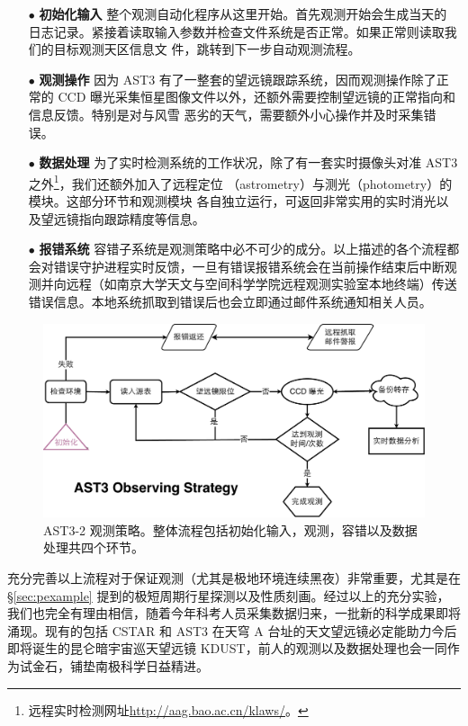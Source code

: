 \begin{enumerate}[leftmargin=1\parindent] 

\item[\tiny$\bullet$] \textbf{初始化输入} {} 整个观测自动化程序从这里开始。首先观测开始会生成当天的
日志记录。紧接着读取输入参数并检查文件系统是否正常。如果正常则读取我们的目标观测天区信息文
件，跳转到下一步自动观测流程。

\item[\tiny$\bullet$] \textbf{观测操作} {} 因为 AST3 有了一整套的望远镜跟踪系统，因而观测操作除了正
常的 CCD 曝光采集恒星图像文件以外，还额外需要控制望远镜的正常指向和信息反馈。特别是对与风雪
恶劣的天气，需要额外小心操作并及时采集错误。

\item[\tiny$\bullet$] \textbf{数据处理} {} 为了实时检测系统的工作状况，除了有一套实时摄像头对准 
AST3之外\footnote{远程实时检测网址\url{http://aag.bao.ac.cn/klaws/}。}，我们还额外加入了远程定位
（astrometry）与测光（photometry）的模块。这部分环节和观测模块
各自独立运行，可返回非常实用的实时消光以及望远镜指向跟踪精度等信息。

\item[\tiny$\bullet$] \textbf{报错系统} {} 容错子系统是观测策略中必不可少的成分。以上描述的各个流程都会对错误守护进程实时反馈，一旦有错误报错系统会在当前操作结束后中断观测并向远程（如南京大学天文与空间科学学院远程观测实验室本地终端）传送错误信息。本地系统抓取到错误后也会立即通过邮件系统通知相关人员。

\end{enumerate}

\begin{figure}[t]
\centering
\includegraphics[width=1.0\textwidth]{figures/chapter2/f12_ast3pipeline.pdf}
\caption{AST3-2 观测策略。整体流程包括初始化输入，观测，容错以及数据处理共四个环节。}
\label{fig:ast3obs}
\end{figure}

充分完善以上流程对于保证观测（尤其是极地环境连续黑夜）非常重要，尤其是在 \S \ref{sec:pexample} 提到的极短周期行星探测以及性质刻画。经过以上的充分实验，我们也完全有理由相信，随着今年科考人员采集数据归来，一批新的科学成果即将涌现。现有的包括 CSTAR 和 AST3 在天穹 A 台址的天文望远镜必定能助力今后即将诞生的昆仑暗宇宙巡天望远镜 KDUST，前人的观测以及数据处理也会一同作为试金石，铺垫南极科学日益精进。


